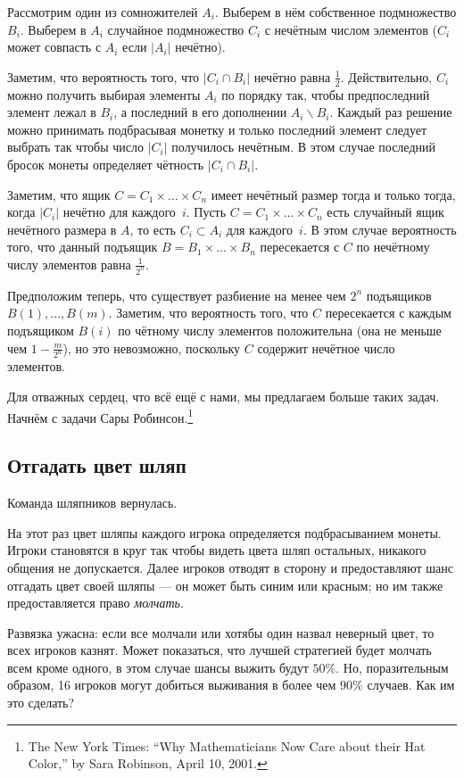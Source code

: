 Рассмотрим один из сомножителей $A_i$. 
Выберем в нём собственное подмножество $B_i$.
Выберем в $A_i$ случайное подмножество $C_i$ с нечётным числом элементов ($C_i$ может совпасть с $A_i$ если $|A_i|$ нечётно).

Заметим, что вероятность того, что $|C_i\cap B_i|$ нечётно равна $\tfrac12$.
Действительно, 
$C_i$ можно получить выбирая элементы $A_i$ по порядку так, чтобы предпоследний элемент лежал в $B_i$, а последний в его дополнении $A_i\backslash B_i$.
Каждый раз решение можно принимать подбрасывая монетку и только последний элемент следует выбрать так чтобы число $|C_i|$ получилось нечётным.
В этом случае последний бросок монеты определяет чётность $|C_i\cap B_i|$.

Заметим, что ящик $C=C_1{\times}\dots{\times}C_n$ имеет нечётный размер тогда и только тогда, когда $|C_i|$ нечётно для каждого~$i$.
Пусть $C=C_1{\times}\dots{\times}C_n$ есть случайный ящик нечётного размера в $A$, то есть $C_i\subset A_i$ для каждого~$i$.
В этом случае вероятность того, что данный подъящик $B=B_1{\times}\dots{\times}B_n$ пересекается с $C$ по нечётному числу элементов равна $\tfrac1{2^n}$. %

Предположим теперь, что существует разбиение на менее чем $2^n$ подъящиков $B(1),\dots,B(m)$.
Заметим, что вероятность того, что $C$ пересекается с каждым подъящиком $B(i)$ по чётному числу элементов положительна (она не меньше чем $1-\tfrac{m}{2^n}$),
но это невозможно, поскольку $C$ содержит нечётное число элементов.
\heart

Для отважных сердец, что всё ещё с нами, мы предлагаем больше таких задач.
Начнём с задачи Сары Робинсон.\footnote{The New York Times: ``Why Mathematicians Now Care about their Hat Color,'' by Sara Robinson, April 10, 2001.}

\subsection*{Отгадать цвет шляп}

Команда шляпников вернулась.

На этот раз цвет шляпы каждого игрока определяется подбрасыванием монеты.
Игроки становятся в круг так чтобы видеть цвета шляп остальных, никакого общения не допускается.
Далее игроков отводят в сторону и предоставляют шанс отгадать цвет своей шляпы --- он может быть синим или красным;
но им также предоставляется право \emph{молчать}.

Развязка ужасна: если все молчали или хотябы один назвал неверный цвет, то всех игроков казнят.
Может показаться, что лучшей стратегией будет молчать всем кроме одного, в этом случае шансы выжить будут $50\%$.
Но, поразительным образом, 16 игроков могут добиться выживания в более чем $90\%$ случаев. %
Как им это сделать?


